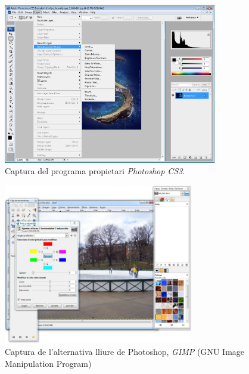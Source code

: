 \begin{figure}[ht!]
\centering
\includegraphics[height=70mm]{data/photoshop.png}
\caption{Captura del programa propietari \emph{Photoshop CS3}.}
\label{photoshop}
\end{figure}

\begin{figure}[ht!]
\centering
\includegraphics[height=70mm]{data/gimp.jpg}
\caption{Captura de l'alternativa lliure de Photoshop, \emph{GIMP} (GNU Image Manipulation Program)}
\label{gimp}
\end{figure}

